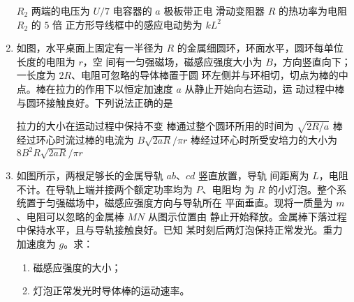 \begin{enumerate}
\fourchoices
{$ R_{2} $ 两端的电压为 $ U/7 $}
{电容器的 $ a $ 极板带正电}
{滑动变阻器 $ R $ 的热功率为电阻 $ R_{2} $ 的 $ 5 $ 倍}
{正方形导线框中的感应电动势为 $ k L^{2} $}



\item
{}
如图，水平桌面上固定有一半径为 $ R $ 的金属细圆环，环面水平，圆环每单位长度的电阻为 $ r $，空
间有一匀强磁场，磁感应强度大小为 $ B $，方向竖直向下；一长度为 $ 2R $、电阻可忽略的导体棒置于圆
环左侧并与环相切，切点为棒的中点。棒在拉力的作用下以恒定加速度 $ a $ 从静止开始向右运动，运
动过程中棒与圆环接触良好。下列说法正确的是  
\begin{figure}[h!]
\centering

\end{figure}

\fourchoices
{拉力的大小在运动过程中保持不变}
{棒通过整个圆环所用的时间为 $\sqrt{2 R / a}$}
{棒经过环心时流过棒的电流为 $B \sqrt{2 a R} / \pi r$}
{棒经过环心时所受安培力的大小为 $8 B^{2} R \sqrt{2 a R} / \pi r$}



\item 
{}
如图所示，两根足够长的金属导轨 $ ab $、$ cd $ 竖直放置，导轨
间距离为 $ L $，电阻不计。在导轨上端并接两个额定功率均为 $ P $、电阻均
为 $ R $ 的小灯泡。整个系统置于匀强磁场中，磁感应强度方向与导轨所在
平面垂直。现将一质量为 $ m $、电阻可以忽略的金属棒 $ MN $ 从图示位置由
静止开始释放。金属棒下落过程中保持水平，且与导轨接触良好。已知
某时刻后两灯泡保持正常发光。重力加速度为 $ g $。求：
\begin{enumerate}
\item
磁感应强度的大小；
\item 
灯泡正常发光时导体棒的运动速率。


\end{enumerate}
\begin{figure}[h!]
\flushright

\end{figure}






\end{enumerate}
